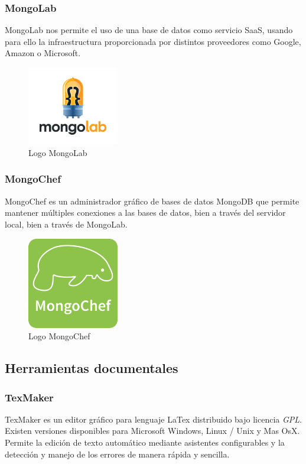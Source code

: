 		\subsubsection{MongoLab}
		MongoLab nos permite el uso de una base de datos como servicio \ac{SaaS}, usando para ello la infraestructura proporcionada por distintos proveedores como Google, Amazon o Microsoft.
				
		\begin{figure}[H]
		\centering
		\includegraphics[width=40mm, fbox={\fboxrule} 4mm]{images/04-metodo/33-mongolab-logo.png}
		\caption{Logo MongoLab}
		\label{fig:mongolab-logo}
		\end{figure}
		
		\subsubsection{MongoChef}
		MongoChef es un administrador gráfico de bases de datos MongoDB que permite mantener múltiples conexiones a las bases de datos, bien a través del servidor local, bien a través de MongoLab.
		
		\begin{figure}[H]
		\centering
		\includegraphics[width=40mm, fbox={\fboxrule} 4mm]{images/04-metodo/32-mongochef_logo.png}
		\caption{Logo MongoChef}
		\label{fig:mongochef-logo}
		\end{figure}
	
	\subsection{Herramientas documentales}
		\subsubsection{TexMaker}
		TexMaker es un editor gráfico para lenguaje LaTex distribuido bajo licencia \textit{\ac{GPL}}. Existen versiones disponibles para Microsoft Windows, Linux / Unix y Mas OsX. Permite la edición de texto automático mediante asistentes configurables y la detección y manejo de los errores de manera rápida y sencilla.
				
